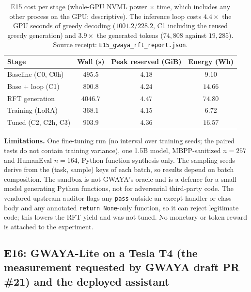 \documentclass[11pt,a4paper]{article}
\begin{document}
\begin{table}[ht!]
\centering
\caption{E15 cost per stage (whole-GPU NVML power $\times$ time, which includes any other process on the GPU: descriptive). The inference loop costs $4.4\times$ the GPU seconds of greedy decoding ($1001.2/228.2$, C1 including the reused greedy generation) and $3.9\times$ the generated tokens ($74{,}808$ against $19{,}285$). Source receipt: \texttt{E15\_gwaya\_rft\_report.json}.}
\label{tab:e15_cost}
\vspace{0.35em}
\begin{tabular}{@{}lccc@{}}
\toprule
\textbf{Stage} & \textbf{Wall (s)} & \textbf{Peak reserved (GiB)} & \textbf{Energy (Wh)} \\
\midrule
Baseline (C0, C0h) & $495.5$ & $4.18$ & $9.10$ \\
Base + loop (C1) & $800.8$ & $4.24$ & $14.66$ \\
RFT generation & $4046.7$ & $4.47$ & $74.80$ \\
Training (LoRA) & $368.1$ & $4.15$ & $6.72$ \\
Tuned (C2, C2h, C3) & $903.9$ & $4.36$ & $16.57$ \\
\bottomrule
\end{tabular}
\end{table}

\textbf{Limitations.} One fine-tuning run (no interval over training seeds; the paired tests do not contain training variance), one 1.5B model, MBPP-sanitized $n=257$ and HumanEval $n=164$, Python function synthesis only. The sampling seeds derive from the (task, sample) keys of each batch, so results depend on batch composition. The sandbox is not GWAYA's oracle and is a defence for a small model generating Python functions, not for adversarial third-party code. The vendored upstream auditor flags any \texttt{pass} outside an except handler or class body and any annotated \texttt{return None}-only function, so it can reject legitimate code; this lowers the RFT yield and was not tuned. No monetary or token reward is attached to the experiment.

\subsection{E16: GWAYA-Lite on a Tesla T4 (the measurement requested by GWAYA draft PR \#21) and the deployed assistant}
\label{sec:e16}
\end{document}
